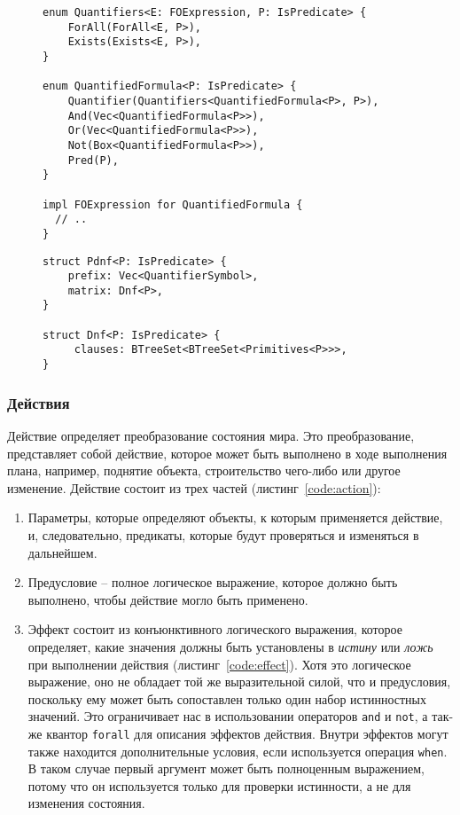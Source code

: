 \documentclass{article}
\begin{document}
\begin{figure}
  \begin{verbatim}
enum Quantifiers<E: FOExpression, P: IsPredicate> {
    ForAll(ForAll<E, P>),
    Exists(Exists<E, P>),
}

enum QuantifiedFormula<P: IsPredicate> {
    Quantifier(Quantifiers<QuantifiedFormula<P>, P>),
    And(Vec<QuantifiedFormula<P>>),
    Or(Vec<QuantifiedFormula<P>>),
    Not(Box<QuantifiedFormula<P>>),
    Pred(P),
}

impl FOExpression for QuantifiedFormula {
  // ..
}
  \end{verbatim}
  \label{code:foexpression}
\end{figure}

\begin{figure}
  \begin{verbatim}
struct Pdnf<P: IsPredicate> {
    prefix: Vec<QuantifierSymbol>,
    matrix: Dnf<P>,
}

struct Dnf<P: IsPredicate> {
     clauses: BTreeSet<BTreeSet<Primitives<P>>>,
}
  \end{verbatim}
  \label{code:pdnf}
\end{figure}

\subsubsection{Действия}

Действие определяет преобразование состояния мира.
Это преобразование, представляет собой действие,
которое может быть выполнено в ходе выполнения плана,
например, поднятие объекта, строительство чего-либо или другое изменение.
Действие состоит из трех частей (листинг~\ref{code:action}):
\begin{enumerate}
  \item Параметры, которые определяют объекты, к которым применяется действие, и, следовательно, предикаты, которые будут проверяться и изменяться в дальнейшем.
  \item Предусловие -- полное логическое выражение, которое должно быть выполнено, чтобы действие могло быть применено.
  \item Эффект состоит из конъюнктивного логического выражения,
    которое определяет, какие значения должны быть установлены в \textit{истину} или \textit{ложь} при выполнении действия (листинг~\ref{code:effect}).
    Хотя это логическое выражение, оно не обладает той же выразительной силой, что и предусловия, поскольку ему может быть сопоставлен только один набор истинностных значений.
    Это ограничивает нас в использовании операторов \texttt{and} и \texttt{not}, а так-же квантор \texttt{forall} для описания эффектов действия.
    Внутри эффектов могут также находится дополнительные условия, если используется операция \texttt{when}.
    В таком случае первый аргумент может быть полноценным выражением, потому что он используется только для проверки истинности,
    а не для изменения состояния.
\end{enumerate}
\end{document}
